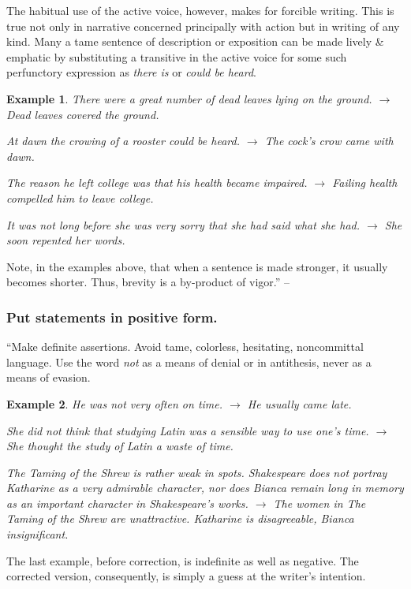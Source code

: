 \documentclass{article}
\newtheorem{example}{Example}
\begin{document}
The habitual use of the active voice, however, makes for forcible writing. This is true not only in narrative concerned principally with action but in writing of any kind. Many a tame sentence of description or exposition can be made lively \& emphatic by substituting a transitive in the active voice for some such perfunctory expression as {\it there is} or {\it could be heard}.
\begin{example}
	There were a great number of dead leaves lying on the ground. $\to$ Dead leaves covered the ground.
	
	At dawn the crowing of a rooster could be heard. $\to$ The cock's crow came with dawn.
	
	The reason he left college was that his health became impaired. $\to$ Failing health compelled him to leave college.
	
	It was not long before she was very sorry that she had said what she had. $\to$ She soon repented her words.
\end{example}
Note, in the examples above, that when a sentence is made stronger, it usually becomes shorter. Thus, brevity is a by-product of vigor.'' -- \cite[p. 32]{Strunk_White_element_style}


\subsubsection{Put statements in positive form.}
``Make definite assertions. Avoid tame, colorless, hesitating, noncommittal language. Use the word {\it not} as a means of denial or in antithesis, never as a means of evasion.
\begin{example}
	He was not very often on time. $\to$ He usually came late.
	
	She did not think that studying Latin was a sensible way to use one's time. $\to$ She thought the study of Latin a waste of time.
	
	\emph{The Taming of the Shrew} is rather weak in spots. Shakespeare does not portray Katharine as a very admirable character, nor does Bianca remain long in memory as an important character in Shakespeare's works. $\to$ The women in \emph{The Taming of the Shrew} are unattractive. Katharine is disagreeable, Bianca insignificant.
\end{example}
The last example, before correction, is indefinite as well as negative. The corrected version, consequently, is simply a guess at the writer's intention.
\end{document}
